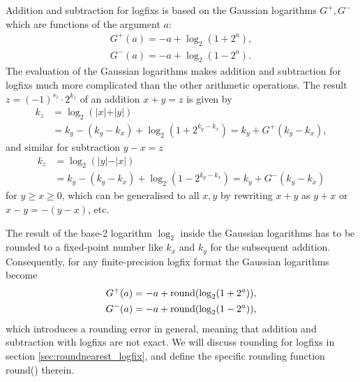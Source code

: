 Addition and subtraction for logfixs is based on the Gaussian logarithms $G^+,G^-$ which are functions of the argument $a$:
\begin{align}
G^+(a) = -a + \log_2(1+2^a), \nonumber \\
G^-(a) = -a + \log_2(1-2^a).
\label{eq:gauss_log}
\end{align}
The evaluation of the Gaussian logarithms makes addition and subtraction for logfixs much more complicated than the other arithmetic operations.
The result $z = (-1)^{s_z} \cdot 2^{k_z}$ of an addition $x+y = z$ is given by
\begin{align}
k_z &= \log_2(\vert x \vert + \vert y \vert) \nonumber \\
	&= k_y - (k_y - k_x) + \log_2(1+2^{k_y - k_x})  = k_y + G^+(k_y-k_x),
\label{eq:logfix_add}
\end{align}
and similar for subtraction $y-x = z$
\begin{align}
k_z &= \log_2(\vert y \vert - \vert x \vert) \nonumber \\
	&= k_y - (k_y-k_x) + \log_2(1-2^{k_y - k_x}) = k_y + G^-(k_y-k_x)
\label{eq:logfix_sub}
\end{align}
for $y \geq x \geq 0$, which can be generalised to all $x,y$ by rewriting $x+y$ as $y+x$ or $x-y = -(y-x)$, etc.

The result of the base-2 logarithm $\log_2$ inside the Gaussian logarithms has to be rounded to a fixed-point
number like $k_x$ and $k_y$ for the subsequent addition. Consequently, for any finite-precision logfix format
the Gaussian logarithms become
\begin{align}
	G^+(a) = -a + \operatorname{round}(\log_2(1+2^a)), \nonumber \\
	G^-(a) = -a + \operatorname{round}(\log_2(1-2^a)),
	\label{eq:gauss_log_round}
\end{align}
which introduces a rounding error in general, meaning that addition and subtraction with logfixs are not exact.
We will discuss rounding for logfixs in section \ref{sec:roundnearest_logfix}, and define the specific rounding function
round() therein.

